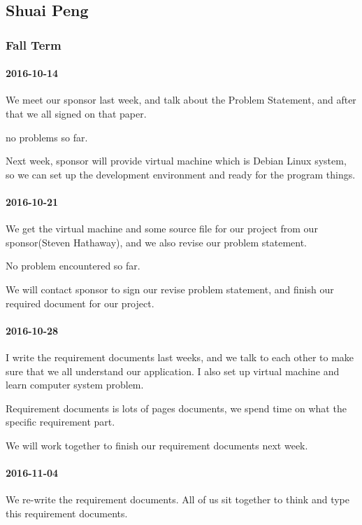 \subsection{Shuai Peng}

\subsubsection{Fall Term}

\paragraph{2016-10-14}

We meet our sponsor last week, and talk about the Problem Statement, and after that we all signed on that paper.


no problems so far.


Next week, sponsor will provide virtual machine which is Debian Linux system, so we can set up the development environment and ready for the program things.


\paragraph{2016-10-21}
We get the virtual machine and some source file for our project from our sponsor(Steven Hathaway), and we also revise our problem statement.


No problem encountered so far.



We will contact sponsor to sign our revise problem statement, and finish our required document for our project.

\paragraph{2016-10-28}
I write the requirement documents last weeks, and we talk to each other to make sure that we all understand our application. I also set up virtual machine and learn computer system problem.


Requirement documents is lots of pages documents, we spend time on what the specific requirement part.


We will work together to finish our requirement documents next week.

\paragraph{2016-11-04}
We re-write the requirement documents. All of us sit together to think and type this requirement documents.


